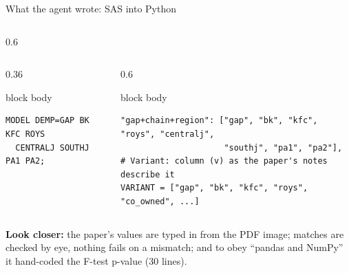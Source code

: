 \documentclass[aspectratio=169,11pt]{beamer}
\begin{document}
\begin{frame}[fragile]{What the agent wrote: SAS into Python}
\begin{columns}[T]
\begin{column}{0.6\textwidth}
\end{column}
\end{columns}
\vspace{0.2em}
\begin{columns}[T]
\begin{column}{0.36\textwidth}
\begin{beamercolorbox}[sep=3pt]{block body}
\begin{verbatim}
MODEL DEMP=GAP BK KFC ROYS
  CENTRALJ SOUTHJ PA1 PA2;
\end{verbatim}
\end{beamercolorbox}
\end{column}
\begin{column}{0.6\textwidth}
\begin{beamercolorbox}[sep=3pt]{block body}
\begin{verbatim}
"gap+chain+region": ["gap", "bk", "kfc", "roys", "centralj",
                     "southj", "pa1", "pa2"],
# Variant: column (v) as the paper's notes describe it
VARIANT = ["gap", "bk", "kfc", "roys", "co_owned", ...]
\end{verbatim}
\end{beamercolorbox}
\end{column}
\end{columns}
\vspace{0.6em}
{\footnotesize
\textbf{Look closer:} the paper's values are \alert{typed in} from the PDF image; matches are \alert{checked by eye}, nothing fails on a mismatch; and to obey ``pandas and NumPy'' it \alert{hand-coded} the F-test p-value (30 lines).}
\end{frame}
\end{document}
